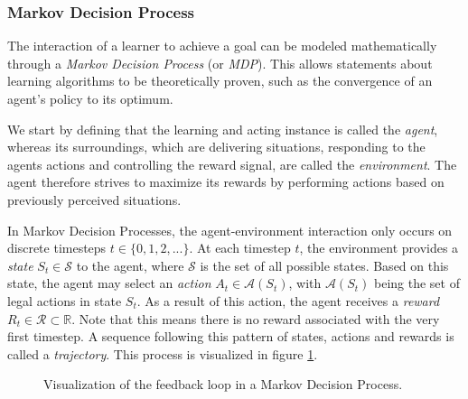 \subsubsection{Markov Decision Process}
The interaction of a learner to achieve a goal can be modeled mathematically through a \textit{Markov Decision Process} (or \textit{MDP}). This allows statements about learning algorithms to be theoretically proven, such as the convergence of an agent's policy to its optimum. \cite{sutton}

We start by defining that the learning and acting instance is called the \textit{agent}, whereas its surroundings, which are delivering situations, responding to the agents actions and controlling the reward signal, are called the \textit{environment}. The agent therefore strives to maximize its rewards by performing actions based on previously perceived situations. \cite{sutton}

In Markov Decision Processes, the agent-environment interaction only occurs on discrete timesteps $t \in \{0, 1, 2, ...\}$. At each timestep $t$, the environment provides a \textit{state} $S_t \in \mathscr{S}$ to the agent, where $\mathscr{S}$ is the set of all possible states. Based on this state, the agent may select an \textit{action} $A_t \in \mathscr{A}(S_t)$, with $\mathscr{A}(S_t)$ being the set of legal actions in state $S_t$. As a result of this action, the agent receives a \textit{reward} $R_t \in \mathscr{R} \subset \mathbb{R}$. Note that this means there is no reward associated with the very first timestep. A sequence following this pattern of states, actions and rewards is called a \textit{trajectory}. This process is visualized in figure \ref{fig:mdp_visualization}. \cite{sutton}

\begin{figure}[h]
    \centering
    \caption{Visualization of the feedback loop in a Markov Decision Process.}
    \label{fig:mdp_visualization}
\end{figure}

